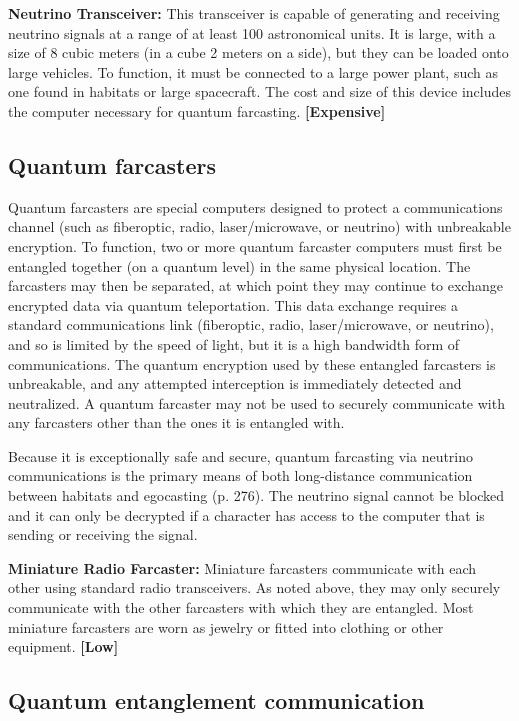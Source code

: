 \textbf{Neutrino Transceiver:} This transceiver is capable of generating and receiving neutrino signals at a range of at least 100 astronomical units. It is large, with a size of 8 cubic meters (in a cube 2 meters on a side), but they can be loaded onto large vehicles. To function, it must be connected to a large power plant, such as one found in habitats or large spacecraft. The cost and size of this device includes the computer necessary for quantum farcasting. \textbf{[Expensive]}

\subsection{Quantum farcasters}
\label{sec:quantum-farcasters}

Quantum farcasters are special computers designed to protect a communications channel (such as fiberoptic, radio, laser/microwave, or neutrino) with unbreakable encryption. To function, two or more quantum farcaster computers must first be entangled together (on a quantum level) in the same physical location. The farcasters may then be separated, at which point they may continue to exchange encrypted data via quantum teleportation. This data exchange requires a standard communications link (fiberoptic, radio, laser/microwave, or neutrino), and so is limited by the speed of light, but it is a high bandwidth form of communications. The quantum encryption used by these entangled farcasters is unbreakable, and any attempted interception is immediately detected and neutralized. A quantum farcaster may not be used to securely communicate with any farcasters other than the ones it is entangled with.

Because it is exceptionally safe and secure, quantum farcasting via neutrino communications is the primary means of both long-distance communication between habitats and egocasting (p. 276). The neutrino signal cannot be blocked and it can only be decrypted if a character has access to the computer that is sending or receiving the signal.

\textbf{Miniature Radio Farcaster:} Miniature farcasters communicate with each other using standard radio transceivers. As noted above, they may only securely communicate with the other farcasters with which they are entangled. Most miniature farcasters are worn as jewelry or fitted into clothing or other equipment. \textbf{[Low]}


\subsection{Quantum entanglement communication}
\label{sec:quantum-entanglement-communication}

